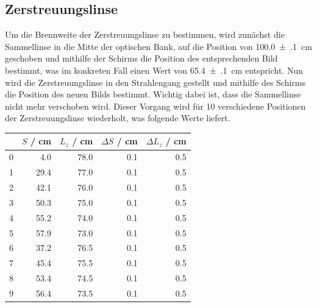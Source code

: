 \documentclass[11pt,ngerman]{scrartcl}
\begin{document}
\subsection{Zerstreuungslinse}

Um die Brennweite der Zerstreuungslinse zu bestimmen, wird zunächst die Sammellinse in die Mitte der optischen Bank, auf die Position von \SI{100.0(1)}{cm} geschoben und mithilfe der Schirms die Position des entsprechenden Bild bestimmt, was im konkreten Fall einen Wert von \SI{65.4(1)}{cm} entspricht. Nun wird die Zerstreuungslinse in den Strahlengang gestellt und mithilfe des Schirms die Position des neuen Bilds bestimmt. Wichtig dabei ist, dass die Sammellinse nicht mehr verschoben wird. Dieser Vorgang wird für 10 verschiedene Positionen der Zerstreuungslinse wiederholt, was folgende Werte liefert.

\begin{center}
	\begin{tabular}{lrrrr}
		\toprule
		{} & $S$ / cm & $L_{z}$ / cm & $\Delta S$ / cm & $\Delta L_{z}$ / cm \\
		\midrule
		0  & 4.0      & 78.0         & 0.1             & 0.5                 \\
		1  & 29.4     & 77.0         & 0.1             & 0.5                 \\
		2  & 42.1     & 76.0         & 0.1             & 0.5                 \\
		3  & 50.3     & 75.0         & 0.1             & 0.5                 \\
		4  & 55.2     & 74.0         & 0.1             & 0.5                 \\
		5  & 57.9     & 73.0         & 0.1             & 0.5                 \\
		6  & 37.2     & 76.5         & 0.1             & 0.5                 \\
		7  & 45.4     & 75.5         & 0.1             & 0.5                 \\
		8  & 53.4     & 74.5         & 0.1             & 0.5                 \\
		9  & 56.4     & 73.5         & 0.1             & 0.5                 \\
		\bottomrule
	\end{tabular}
	\label{tab:werte_zerstreuungslinse}
\end{center}
\end{document}
